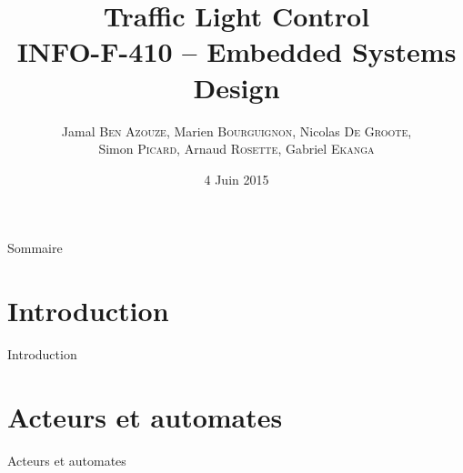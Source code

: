 \documentclass{bredelebeamer}
\begin{document}
\title[INFO-F-410 - Traffic Light Control]{\textbf{Traffic Light Control} \\INFO-F-410 -- Embedded Systems Design} %

\author{Jamal \textsc{Ben Azouze}, Marien \textsc{Bourguignon}, Nicolas \textsc{De Groote}, \\Simon \textsc{Picard}, Arnaud \textsc{Rosette}, Gabriel \textsc{Ekanga}}
\date{4 Juin 2015} %

\begin{frame}
\titlepage %
\end{frame}

\begin{frame}{Sommaire}
\tableofcontents %
\end{frame}

\section{Introduction}
\begin{frame}{Introduction}

\end{frame}

\section{Acteurs et automates}
\begin{frame}{Acteurs et automates}

\end{frame}
\end{document}
